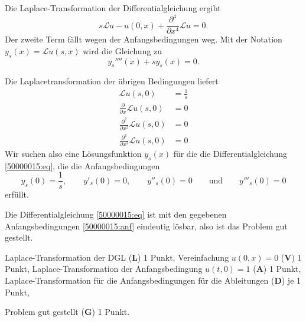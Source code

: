 \begin{loesung}
\begin{teilaufgaben}
\item
Die Laplace-Transformation der Differentialgleichung ergibt
\[
s{\mathscr{L}u} - u(0,x) + \frac{\partial^4}{\partial x^4}{\mathscr{L}u} = 0.
\]
Der zweite Term fällt wegen der Anfangsbedingungen weg.
Mit der Notation $y_s(x) = \mathscr{L}u(s,x)$ wird die Gleichung zu
\begin{equation}
y_s''''(x)+sy_s(x)=0.
\label{50000015:eq}
\end{equation}

Die Laplacetransformation der übrigen Bedingungen liefert
\begin{align*}
\mathscr{L} u(s,0)&=\frac1s
\\
\frac{\partial}{\partial x}\mathscr{L}u(s,0)&= 0\\
\frac{\partial^2}{\partial x^2}\mathscr{L}u(s,0)&= 0\\
\frac{\partial^3}{\partial x^3}\mathscr{L}u(s,0)&= 0
\end{align*}
Wir suchen also eine Lösungsfunktion $y_s(x)$ für die die Differentialgleichung
\eqref{50000015:eq}, die die Anfangsbedingungen
\begin{equation}
y_s(0)=\frac1s,\qquad
y'_s(0)=0,\qquad
y''_s(0)=0
\qquad\text{und}\qquad
y'''_s(0)=0
\label{50000015:anf}
\end{equation}
erfüllt.
\item
Die Differentialgleichung \eqref{50000015:eq} ist mit den gegebenen
Anfangsbedingungen \eqref{50000015:anf} eindeutig lösbar, also ist
das Problem gut gestellt.
\qedhere
\end{teilaufgaben}
\end{loesung}

\begin{bewertung}
\begin{teilaufgaben}
\item
Laplace-Transformation der DGL ({\bf L}) 1 Punkt,
Vereinfachung $u(0,x)=0$ ({\bf V}) 1 Punkt,
Laplace-Transformation der Anfangsbedingung $u(t,0)=1$ ({\bf A}) 1 Punkt,
Laplace-Transformation für die Anfangsbedingungen für die Ableitungen
({\bf D}) je 1 Punkt,
\item
Problem gut gestellt ({\bf G}) 1 Punkt.
\end{teilaufgaben}
\end{bewertung}
